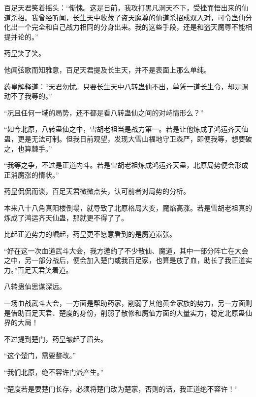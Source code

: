 \begin{this_body}
百足天君笑着摇头：“惭愧。这是日前，我攻打黑凡洞天不下，受挫而悟出来的仙道杀招。我曾经听闻，长生天中收藏了盗天魔尊的仙道杀招成双入对，可令蛊仙分化出一个完全和自己战力相同的分身出来。我的这些手段，还是和盗天魔尊不能相提并论的。”

药皇笑了笑。

他闻弦歌而知雅意，百足天君提及长生天，并不是表面上那么单纯。

药皇解释道：“天君勿忧。只要长生天中八转蛊仙不出，单凭一道长生令，却是调动不了我等的。”

“况且任何一域的局势，还不都是看八转蛊仙之间的对峙情形么？”

“如今北原，八转蛊仙之中，雪胡老祖当是战力第一。若是让他炼成了鸿运齐天仙蛊，更是无法可制。但我日前观望，发现大雪山福地守卫森严，即便我等，想要破之，也算棘手。”

“我等之争，不过是正道内斗。若是雪胡老祖炼成鸿运齐天蛊，北原局势便会形成正消魔涨的情状。”

药皇侃侃而谈，百足天君微微点头，认可前者对局势的分析。

本来八十八角真阳楼倒塌，就导致了北原格局大变，魔焰高涨。若是雪胡老祖真的炼成了鸿运齐天仙蛊，那就更不得了了。

比起正道势力的崛起，药皇更不愿意看到的是魔道嚣张。

“好在这一次血道武斗大会，我方邀约了不少散仙、魔道，其中一部分阵亡在大会之中，另一部分战后，便会加入楚门或我百足家，也算是放了血，助长了我正道实力。”百足天君笑着道。

八转蛊仙思谋深远。

一场血战武斗大会，一方面是帮助药家，削弱了其他黄金家族的势力，另一方面则是借助百足天君、楚度的身份，削弱了散修和魔仙方面的大量实力，稳定北原蛊仙界的大局！

不过提到楚门，药皇皱起了眉头。

“这个楚门，需要整改。”

“我们北原，绝不容许门派产生。”

“楚度若是要楚门长存，必须将楚门改为楚家，否则的话，我正道绝不容许！”

\end{this_body}

